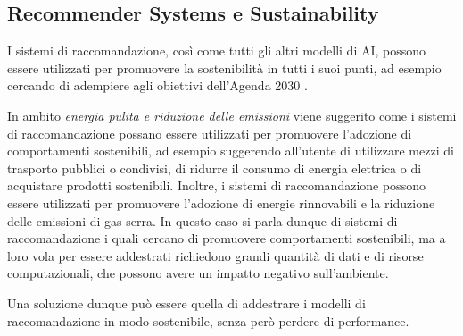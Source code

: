 \subsection{Recommender Systems e Sustainability}

I sistemi di raccomandazione, così come tutti gli altri modelli di AI, possono essere utilizzati per promuovere la sostenibilità in tutti i suoi punti, ad esempio cercando di adempiere agli obiettivi dell'Agenda 2030 \cite{RecommenderSustainability}.

\noindent In ambito \textit{energia pulita e riduzione delle emissioni} viene suggerito come i sistemi di raccomandazione possano essere utilizzati per promuovere l'adozione di comportamenti sostenibili, ad esempio suggerendo all'utente di utilizzare mezzi di trasporto pubblici o condivisi, di ridurre il consumo di energia elettrica o di acquistare prodotti sostenibili. Inoltre, i sistemi di raccomandazione possono essere utilizzati per promuovere l'adozione di energie rinnovabili e la riduzione delle emissioni di gas serra. In questo caso si parla dunque di sistemi di raccomandazione i quali cercano di promuovere comportamenti sostenibili, ma a loro vola per essere addestrati richiedono grandi quantità di dati e di risorse computazionali, che possono avere un impatto negativo sull'ambiente.

\noindent Una soluzione dunque può essere quella di addestrare i modelli di raccomandazione in modo sostenibile, senza però perdere di performance.


